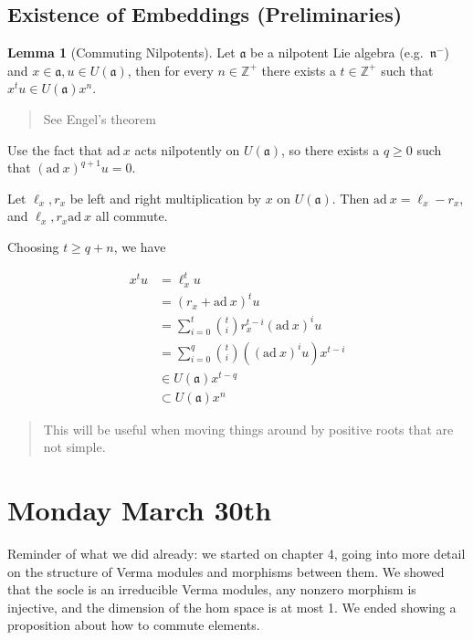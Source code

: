 \documentclass[11pt]{scrartcl}
\theoremstyle{definition}
\theoremstyle{theorem}
\newtheorem{lemma}[theorem]{Lemma}
\theoremstyle{proof}
\newenvironment{proof}
{\pushQED{$\qed$}\pf}
{\par\popQED\endpf}
\theoremstyle{definition}
\theoremstyle{break}
\theoremstyle{problem}
\DeclarePairedDelimiter\qty{(}{)}
\renewcommand{\qty}[1]{{\left(  {#1} \right)}}
\newcommand{\ZZ}[0]{{\mathbb{Z}}}
\newcommand{\ad}[0]{\mathrm{ad}~}
\newcommand{\mfa}[0]{{\mathfrak{a}}}
\newcommand{\lien}[0]{{\mathfrak{n}}}
\renewcommand{\qed}[0]{\hfill\blacksquare}
\begin{document}
\hypertarget{existence-of-embeddings-preliminaries}{%
\subsection{Existence of Embeddings
(Preliminaries)}\label{existence-of-embeddings-preliminaries}}

\begin{lemma}[Commuting Nilpotents]

Let \(\mfa\) be a nilpotent Lie algebra (e.g.~\(\lien^-\)) and
\(x\in \mfa, u\in U(\mfa)\), then for every \(n\in \ZZ^+\) there exists
a \(t\in \ZZ^+\) such that \(x^t u \in U(\mfa) x^n\).\end{lemma}

\begin{quote}
See Engel's theorem
\end{quote}

\begin{proof}

Use the fact that \(\ad x\) acts nilpotently on \(U(\mfa)\), so there
exists a \(q\geq 0\) such that \(\qty{\ad x}^{q+1}u = 0\).

Let \(\ell_x, r_x\) be left and right multiplication by \(x\) on
\(U(\mfa)\). Then \(\ad x = \ell_x - r_x\), and \(\ell_x, r_x \ad x\)
all commute.

Choosing \(t \geq q + n\), we have

\begin{align*}
x^t u &= \ell_x^t u \\
&= (r_x + \ad x)^t u \\
&= \sum_{i=0}^t {t \choose i} r_x^{t-i} \qty{\ad x}^i u \\
&= \sum_{i=0}^q {t \choose i} \qty{\qty{\ad x}^iu  }x^{t-i} \\
&\in U(\mfa) x^{t-q} \\
&\subset U(\mfa) x^n
\end{align*}\end{proof}

\begin{quote}
This will be useful when moving things around by positive roots that are
not simple.
\end{quote}

\hypertarget{monday-march-30th}{%
\section{Monday March 30th}\label{monday-march-30th}}

Reminder of what we did already: we started on chapter 4, going into
more detail on the structure of Verma modules and morphisms between
them. We showed that the socle is an irreducible Verma modules, any
nonzero morphism is injective, and the dimension of the hom space is at
most 1. We ended showing a proposition about how to commute elements.
\end{document}
